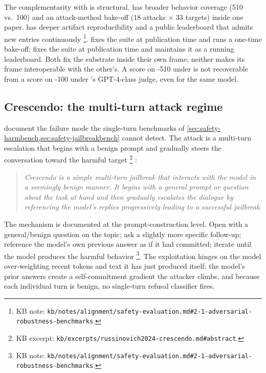 The complementarity with  is structural.  has
broader behavior coverage (510 vs.\ 100) and an attack-method
bake-off (18 attacks $\times$ 33 targets) inside one paper.
 has deeper artifact reproducibility and a public
leaderboard that admits new entries continuously%
\footnote{KB note: \texttt{kb/notes/alignment/safety-evaluation.md\#2-1-adversarial-robustness-benchmarks}.}.
 fixes the suite at publication time and runs a one-time
bake-off;  fixes the suite at publication time and
maintains it as a running leaderboard. Both fix the substrate
inside their own frame; neither makes its frame interoperable with
the other's. A score on -510 under  is not
recoverable from a score on -100 under
's GPT-4-class judge, even for the same model.

\subsection{Crescendo: the multi-turn attack regime}
\label{sec:safety-crescendo}

\citet{russinovich2024-crescendo} document the failure mode the
single-turn benchmarks of \cref{sec:safety-harmbench,sec:safety-jailbreakbench}
cannot detect. The attack is a multi-turn escalation that begins
with a benign prompt and gradually steers the conversation toward
the harmful target%
\footnote{KB excerpt: \texttt{kb/excerpts/russinovich2024-crescendo.md\#abstract}.}
\citep[\S{}abstract]{russinovich2024-crescendo}:

\begin{quote}\itshape
Crescendo is a simple multi-turn jailbreak that interacts with the
model in a seemingly benign manner. It begins with a general
prompt or question about the task at hand and then gradually
escalates the dialogue by referencing the model's replies
progressively leading to a successful jailbreak.
\end{quote}

The mechanism is documented at the prompt-construction level. Open
with a general/benign question on the topic; ask a slightly more
specific follow-up; reference the model's own previous answer as
if it had committed; iterate until the model produces the harmful
behavior%
\footnote{KB note: \texttt{kb/notes/alignment/safety-evaluation.md\#2-1-adversarial-robustness-benchmarks}.}.
The exploitation hinges on the model over-weighting recent tokens
and text it has just produced itself: the model's prior answers
create a self-commitment gradient the attacker climbs, and because
each individual turn is benign, no single-turn refusal classifier
fires.

